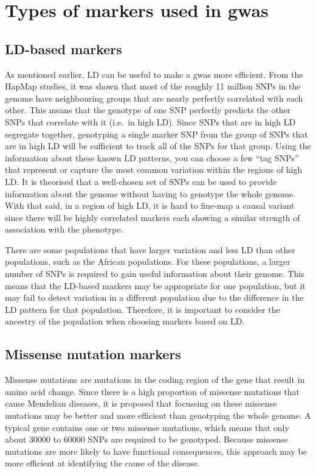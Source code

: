 \section{Types of markers used in \gls{gwas}}
\label{sec:types_of_markers_used_in_gwas}

\subsection{LD-based markers}
\label{sub:ld_based_markers}

As mentioned earlier, LD can be useful to make a \gls{gwas} more efficient.
From the HapMap studies, it was shown that most of the roughly 11 million SNPs in the genome have neighbouring groups that are nearly perfectly correlated with each other.
This means that the genotype of one SNP perfectly predicts the other SNPs that correlate with it (i.e.\ in high LD).
Since SNPs that are in high LD segregate together, genotyping a single marker SNP from the group of SNPs that are in high LD will be sufficient to track all of the SNPs for that group.
Using the information about these known LD patterns, you can choose a few ``tag SNPs'' that represent or capture the most common variation within the regions of high LD.
It is theorised that a well-chosen set of SNPs can be used to provide information about the genome without having to genotype the whole genome.
With that said, in a region of high LD, it is hard to fine-map a causal variant since there will be highly correlated markers each showing a similar strength of association with the phenotype.

There are some populations that have larger variation and less LD than other populations, such as the African populations.
For these populations, a larger number of SNPs is required to gain useful information about their genome.
This means that the LD-based markers may be appropriate for one population, but it  may fail to detect variation in a different population due to the difference in the LD pattern for that population.
Therefore, it is important to consider the ancestry of the population when choosing markers based on LD.

\subsection{Missense mutation markers}
\label{sub:missense_mutation_markers}

Missense mutations are mutations in the coding region of the gene that result in amino acid change.
Since there is a high proportion of missense mutations that cause Mendelian diseases, it is proposed that focussing on these missense mutations may be better and more efficient than genotyping the whole genome.
A typical gene contains one or two missense mutations, which means that only about 30000 to 60000 SNPs are required to be genotyped.
Because missense mutations are more likely to have functional consequences, this approach may be more efficient at identifying the cause of the disease.

